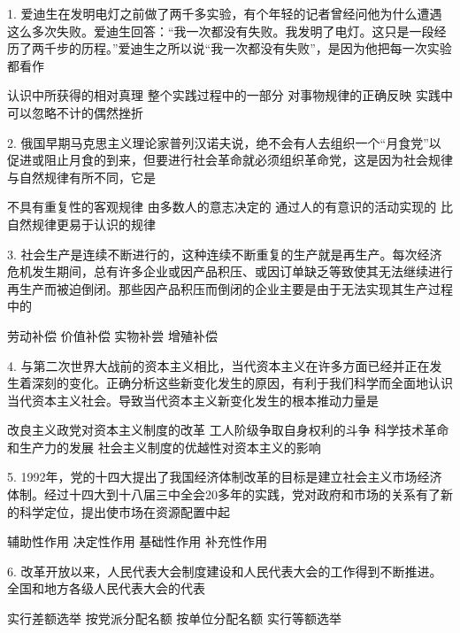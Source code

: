 1. 爱迪生在发明电灯之前做了两千多实验，有个年轻的记者曾经问他为什么遭遇这么多次失败。爱迪生回答：“我一次都没有失败。我发明了电灯。这只是一段经历了两千步的历程。”爱迪生之所以说“我一次都没有失败”，是因为他把每一次实验都看作
\begin{choices}
	 认识中所获得的相对真理
	 整个实践过程中的一部分
	 对事物规律的正确反映
	 实践中可以忽略不计的偶然挫折
\end{choices}

2. 俄国早期马克思主义理论家普列汉诺夫说，绝不会有人去组织一个“月食党”以促进或阻止月食的到来，但要进行社会革命就必须组织革命党，这是因为社会规律与自然规律有所不同，它是
\begin{choices}
	 不具有重复性的客观规律
	 由多数人的意志决定的
	 通过人的有意识的活动实现的
	 比自然规律更易于认识的规律
\end{choices}

3. 社会生产是连续不断进行的，这种连续不断重复的生产就是再生产。每次经济危机发生期间，总有许多企业或因产品积压、或因订单缺乏等致使其无法继续进行再生产而被迫倒闭。那些因产品积压而倒闭的企业主要是由于无法实现其生产过程中的
\begin{choices}
	 劳动补偿
	 价值补偿
	 实物补尝
	 增殖补偿
\end{choices}

4. 与第二次世界大战前的资本主义相比，当代资本主义在许多方面已经并正在发生着深刻的变化。正确分析这些新变化发生的原因，有利于我们科学而全面地认识当代资本主义社会。导致当代资本主义新变化发生的根本推动力量是
\begin{choices}
	 改良主义政党对资本主义制度的改革
	 工人阶级争取自身权利的斗争
	 科学技术革命和生产力的发展
	 社会主义制度的优越性对资本主义的影响
\end{choices}

5. 1992年，党的十四大提出了我国经济体制改革的目标是建立社会主义市场经济体制。经过十四大到十八届三中全会20多年的实践，党对政府和市场的关系有了新的科学定位，提出使市场在资源配置中起
\begin{choices}
	 辅助性作用
	 决定性作用
	 基础性作用
	 补充性作用
\end{choices}

6. 改革开放以来，人民代表大会制度建设和人民代表大会的工作得到不断推进。全国和地方各级人民代表大会的代表
\begin{choices}
	 实行差额选举
	 按党派分配名额
	 按单位分配名额
	 实行等额选举
\end{choices}

